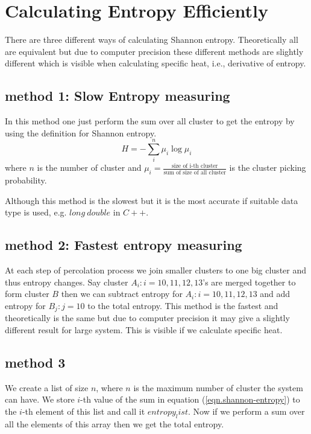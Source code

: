 \documentclass[10pt,a4paper]{report}
\begin{document}
\chapter{Calculating Entropy Efficiently}
	There are three different ways of calculating Shannon entropy. Theoretically all are equivalent but due to computer precision these different methods are slightly different which is visible when calculating specific heat, i.e., derivative of entropy.
	\section{method 1: Slow Entropy measuring}
	In this method one just perform the sum over all cluster to get the entropy by using the definition for Shannon entropy.
	\begin{equation}
		H = - \sum_{i}^{n} \mu_i \log \mu_i
		\label{eqn.shannon-entropy}
	\end{equation}
	where $n$ is the number of cluster and $\mu_i = \frac{\text{size of i-th cluster}}{\text{sum of size of all cluster}}$ is the cluster picking probability.
	
	Although this method is the slowest but it is the most accurate if suitable data type is used, e.g. $long\ double$ in $C++$.
	
	\section{method 2: Fastest entropy measuring}
	At each step of percolation process we join smaller clusters to one big cluster and thus entropy changes. Say cluster $A_i : i={10,11,12,13}$'s are merged together to form cluster $B$ then we can subtract entropy for $A_i : i={10,11,12,13}$ and add entropy for $B_j : j = {10}$ to the total entropy. This method is the fastest and theoretically is the same but due to computer precision it may give a slightly different result for large system. This is visible if we calculate specific heat.
	
	\section{method 3}
	We create a list of size $n$, where $n$ is the maximum number of cluster the system can have. We store $i$-th value of the sum in equation (\ref{eqn.shannon-entropy}) to the $i$-th element of this list and call it $entropy_list$. 
	Now if we perform a sum over all the elements of this array then we get the total entropy.
	
\end{document}
